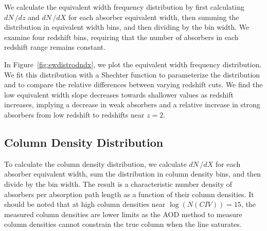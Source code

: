 \documentclass[linenumbers,twocolumn]{aastex61}
\begin{document}
We calculate the equivalent width frequency distribution by first calculating $dN\,/dz$ and $dN\,/dX$ for each absorber equivalent width, then summing the distribution in equivalent width bins, and then dividing by the bin width. We examine four redshift bins, requiring that the number of absorbers in each redshift range remains constant.

In Figure~\ref{fig:ewdistrodndx}, we plot the equivalent width frequency distribution. We fit this distribution with a Shechter function to parameterize the distribution and to compare the relative differences between varying redshift cuts. We find the low equivalent width slope decreases towards shallower values as redshift increases, implying a decrease in weak {\CIV} absorbers and a relative increase in strong {\CIV} absorbers from low redshift to redshifts near $z = 2$.

\begin{figure*}[bth]
\caption{The equivalent width distribution of ${\CIV}$ absorbers, defined as the comoving line density ($\frac{dN}{dX}$) in each equivalent width bin divided by the bin width. We fit this distribution with a Schechter function, capturing the self-similar power law behavior of the distribution before the exponential cutoff limiting the size of ${\CIV}$ absorbers.}
\label{fig:ewdistrodndz}
\end{figure*}

\begin{figure*}[bth]
\caption{The equivalent width distribution of {\CIV} absorbers, defined as the comoving line density ($\frac{dN}{dX}$) in each equivalent width bin divided by the bin width. We fit this distribution with a Schechter function, capturing the self-similar power law behavior of the distribution before the exponential cutoff limiting the size of {\CIV} absorbers.}
\label{fig:ewdistrodndx}
\end{figure*}

\subsection{Column Density Distribution}
\label{sec:logndistro}

To calculate the column density distribution, we calculate $dN\,/dX$ for each absorber equivalent width, sum the distribution in column density bins, and then divide by the bin width. The result is a characteristic number density of {\CIV} absorbers per absorption path length as a function of their column densities. It should be noted that at high column densities near $\log (N(CIV)) = 15$, the measured column densities are lower limits as the AOD method to measure column densities cannot constrain the true column when the line saturates.
\end{document}
